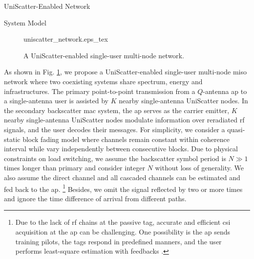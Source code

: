 \documentclass[journal]{IEEEtran}
\begin{document}
\begin{section}{UniScatter-Enabled Network}
	\begin{subsection}{System Model}
		\begin{figure}[!t]
			\centering
			\def\svgwidth{0.8\columnwidth}
			\footnotesize{
				{uniscatter_network.eps_tex}
			}
			\caption{A UniScatter-enabled single-user multi-node network.}
			\label{fi:uniscatter_network}
		\end{figure}
		As shown in Fig. \ref{fi:uniscatter_network}, we propose a UniScatter-enabled single-user multi-node \gls{miso} network where two coexisting systems share spectrum, energy and infrastructures.
		The primary point-to-point transmission from a $Q$-antenna \gls{ap} to a single-antenna user is assisted by $K$ nearby single-antenna UniScatter nodes.
		In the secondary backscatter \gls{mac} system, the \gls{ap} serves as the carrier emitter, $K$ nearby single-antenna UniScatter nodes modulate information over reradiated \gls{rf} signals, and the user decodes their messages.
		For simplicity, we consider a quasi-static block fading model where channels remain constant within coherence interval while vary independently between consecutive blocks.
		Due to physical constraints on load switching, we assume the backscatter symbol period is $N \gg 1$ times longer than primary and consider integer $N$ without loss of generality.
		We also assume the direct channel and all cascaded channels can be estimated and fed back to the \gls{ap}.%
		\footnote{
			Due to the lack of \gls{rf} chains at the passive tag, accurate and efficient \gls{csi} acquisition at the \gls{ap} can be challenging.
			One possibility is the \gls{ap} sends training pilots, the tags respond in predefined manners, and the user performs least-square estimation with feedbacks \cite{Bharadia2015,Yang2015b,Guo2019g}.
		}
		Besides, we omit the signal reflected by two or more times\cite{Wu2019} and ignore the time difference of arrival from different paths\cite{Guo2019b}.



\end{subsection}
\end{section}
\end{document}
